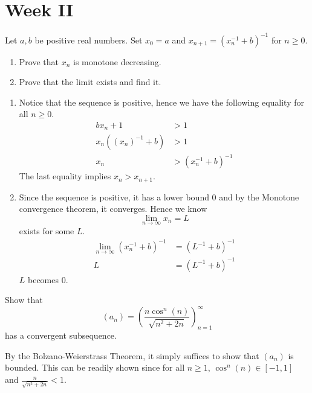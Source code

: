 \documentclass[../main.tex]{subfiles}
\begin{document}
\section{Week II}

\begin{problem}
    Let $a, b$ be positive real numbers.
    Set $x_0 = a$ and $x_{n + 1} = (x_n^{-1} + b)^{-1}$ for $n \ge 0$.
    \begin{enumerate}[label=(\alph*)]
        \item Prove that $x_n$ is monotone decreasing.
        \item Prove that the limit exists and find it.
    \end{enumerate}
\end{problem}
\begin{enumerate}[label=(\alph*)]
    \item Notice that the sequence is positive, hence we have the following equality for all $n \ge 0$.
        \begin{align*}
            b x_n + 1 &> 1 \\
            x_n ((x_n)^{-1} + b) &> 1 \\
            x_n &> (x_n^{-1} + b)^{-1}
        \end{align*}
        The last equality implies $x_n > x_{n + 1}$.
    \item Since the sequence is positive, it has a lower bound 0 and by the Monotone convergence theorem, it converges.
        Hence we know
        \[
            \lim_{n \to \infty} x_n = L
        \]
        exists for some $L$.
        \begin{align*}
            \lim_{n \to \infty} (x_n^{-1} + b)^{-1}
            &= (L^{-1} + b)^{-1} \\
            L &= (L^{-1} + b)^{-1}
        \end{align*}
        $L$ becomes 0.
\end{enumerate}

\begin{problem}[\S2.7 A]
    Show that
    \[
        (a_n) = \left( \frac{n \cos^n(n)}{\sqrt{n^2 + 2n}} \right)_{n = 1}^\infty
    \]
    has a convergent subsequence.
\end{problem}
By the Bolzano-Weierstrass Theorem, it simply suffices to show that $(a_n)$ is bounded.
This can be readily shown since for all $n \ge 1$, $\cos^n(n) \in [-1, 1]$ and $\frac{n}{\sqrt{n^2 + 2n}} < 1$.
\end{document}
